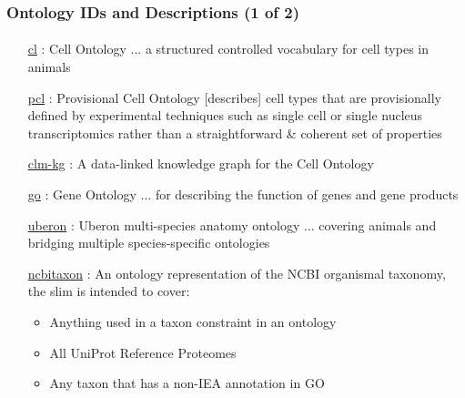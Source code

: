 \documentclass[aspectratio=169,xcolor=dvipsnames]{beamer}
\begin{document}
\begin{frame}
  \frametitle{Ontology IDs and Descriptions (1 of 2)}
  \framesubtitle{}
  \begin{itemize}\footnotesize
  \item[\href{"http://purl.obolibrary.org/obo/cl.owl"}{cl}]: Cell
    Ontology ... a structured controlled vocabulary for cell types in
    animals
  \item[\href{"http://purl.obolibrary.org/obo/pcl.owl"}{pcl}]:
    Provisional Cell Ontology [describes] cell types that are
    provisionally defined by experimental techniques such as single
    cell or single nucleus transcriptomics rather than a
    straightforward \& coherent set of properties
  \item[\href{"https://raw.githubusercontent.com/Cellular-Semantics/CellMark/refs/heads/main/clm-kg.owl"}{clm-kg}]:
    A data-linked knowledge graph for the Cell Ontology
  \item[\href{"https://purl.obolibrary.org/obo/go/extensions/go-plus.owl"}{go}]:
    Gene Ontology ... for describing the function of genes and gene
    products
  \item[\href{"http://purl.obolibrary.org/obo/uberon/uberon-base.owl"}{uberon}]:
    Uberon multi-species anatomy ontology ... covering animals and
    bridging multiple species-specific ontologies
  \item[\href{"http://purl.obolibrary.org/obo/ncbitaxon/subsets/taxslim.owl"}{ncbitaxon}]:
    An ontology representation of the NCBI organismal taxonomy, the
    slim is intended to cover:
    \begin{itemize}\scriptsize
    \item Anything used in a taxon constraint in an ontology
    \item All UniProt Reference Proteomes
    \item Any taxon that has a non-IEA annotation in GO
    \end{itemize}
  \end{itemize}
\end{frame}
\end{document}
